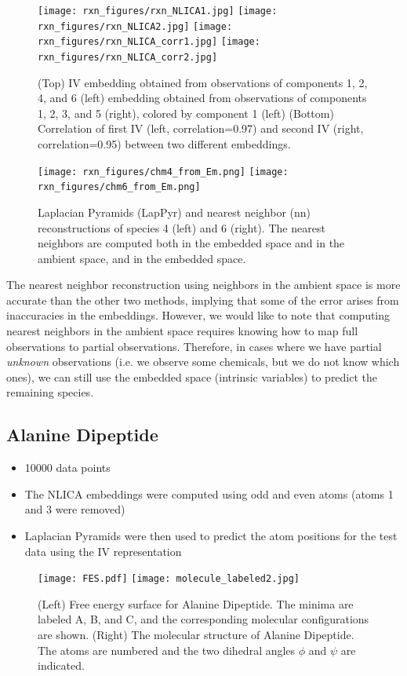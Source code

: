\documentclass[12pt]{article}
\begin{document}
\begin{figure}[H]
    \texttt{[image: rxn\_figures/rxn\_NLICA1.jpg]}
    \texttt{[image: rxn\_figures/rxn\_NLICA2.jpg]}
    \texttt{[image: rxn\_figures/rxn\_NLICA\_corr1.jpg]}
    \texttt{[image: rxn\_figures/rxn\_NLICA\_corr2.jpg]}
    \caption{(Top) IV embedding obtained from observations of components 1, 2, 4, and 6 (left) embedding obtained from observations of components 1, 2, 3, and 5 (right), colored by component 1 (left) (Bottom) Correlation of first IV (left, correlation=0.97) and second IV (right, correlation=0.95) between two different embeddings.}
\end{figure}

\begin{figure}[H]
    \texttt{[image: rxn\_figures/chm4\_from\_Em.png]}
    \texttt{[image: rxn\_figures/chm6\_from\_Em.png]}
    \caption{Laplacian Pyramids (LapPyr) and nearest neighbor (nn) reconstructions of species 4 (left) and 6 (right). The nearest neighbors are computed both in the embedded space and in the ambient space, and in the embedded space.}
\end{figure}

The nearest neighbor reconstruction using neighbors in the ambient space is more accurate than the other two methods, implying that some of the error arises from inaccuracies in the embeddings.
%
However, we would like to note that computing nearest neighbors in the ambient space requires knowing how to map full observations to partial observations.
%
Therefore, in cases where we have partial {\em unknown} observations (i.e. we observe some chemicals, but we do not know which ones), we can still use the embedded space (intrinsic variables) to predict the remaining species.

\subsection{Alanine Dipeptide}

\begin{itemize}
  \item 10000 data points
  \item The NLICA embeddings were computed using odd and even atoms (atoms 1 and 3 were removed)
  \item Laplacian Pyramids were then used to predict the atom positions for the test data using the IV representation
\end{itemize}

\begin{figure}[H]
    \texttt{[image: FES.pdf]}
    \texttt{[image: molecule\_labeled2.jpg]}
    \caption{(Left) Free energy surface for Alanine Dipeptide. The minima are labeled A, B, and C, and the corresponding molecular configurations are shown. (Right) The molecular structure of Alanine Dipeptide. The atoms are numbered and the two dihedral angles $\phi$ and $\psi$ are indicated.}
\end{figure}
\end{document}
